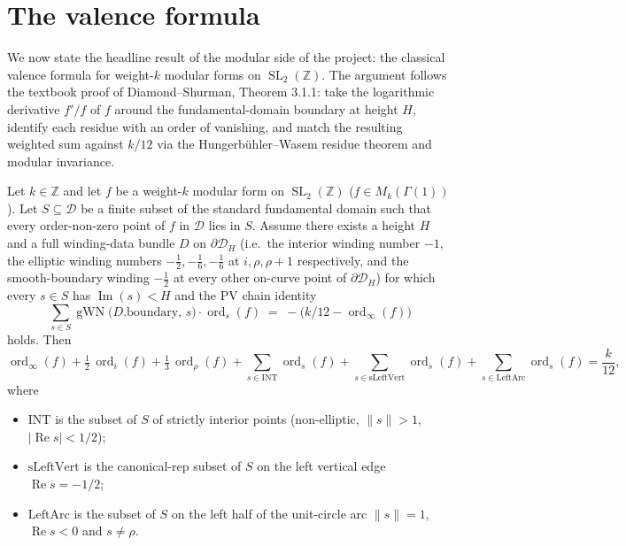 \section{The valence formula}\label{sec:valence}

We now state the headline result of the modular side of the project:
the classical valence formula for weight-$k$ modular forms on
$\operatorname{SL}_2(\mathbb{Z})$. The argument follows the textbook
proof of Diamond--Shurman, Theorem 3.1.1: take the logarithmic
derivative $f'/f$ of $f$ around the fundamental-domain boundary at
height $H$, identify each residue with an order of vanishing, and
match the resulting weighted sum against $k/12$ via the
Hungerbühler--Wasem residue theorem and modular invariance.

\begin{theorem}
  \label{thm:valence-orbit-sum-of-pvChain}
  \leanok
  Let $k \in \mathbb{Z}$ and let $f$ be a weight-$k$ modular form on
  $\operatorname{SL}_2(\mathbb{Z})$ ($f \in M_k(\Gamma(1))$). Let
  $S \subseteq \mathcal{D}$ be a finite subset of the standard
  fundamental domain such that every order-non-zero point of $f$ in
  $\mathcal{D}$ lies in $S$. Assume there exists a height $H$ and a
  full winding-data bundle $D$ on $\partial \mathcal{D}_H$ (i.e.\ the
  interior winding number $-1$, the elliptic winding numbers
  $-\tfrac{1}{2}, -\tfrac{1}{6}, -\tfrac{1}{6}$ at $i, \rho, \rho+1$
  respectively, and the smooth-boundary winding $-\tfrac{1}{2}$ at
  every other on-curve point of $\partial \mathcal{D}_H$) for which
  every $s \in S$ has $\operatorname{Im}(s) < H$ and the
  PV chain identity
  \[
    \sum_{s \in S}
      \operatorname{gWN}\!\bigl(D.\mathrm{boundary},\, s\bigr) \cdot
      \operatorname{ord}_{s}(f)
    \;=\; -\bigl(k/12 - \operatorname{ord}_\infty(f)\bigr)
  \]
  holds. Then
  \[
    \operatorname{ord}_\infty(f) + \tfrac{1}{2}\,\operatorname{ord}_{i}(f)
      + \tfrac{1}{3}\,\operatorname{ord}_{\rho}(f)
      + \sum_{s \in \mathrm{INT}}\operatorname{ord}_{s}(f)
      + \sum_{s \in \mathrm{sLeftVert}} \operatorname{ord}_{s}(f)
      + \sum_{s \in \mathrm{LeftArc}} \operatorname{ord}_{s}(f)
    = \frac{k}{12},
  \]
  where
  \begin{itemize}
    \item $\mathrm{INT}$ is the subset of $S$ of strictly interior
      points (non-elliptic, $\|s\| > 1$, $|\operatorname{Re} s| < 1/2$);
    \item $\mathrm{sLeftVert}$ is the canonical-rep subset of $S$
      on the left vertical edge $\operatorname{Re} s = -1/2$;
    \item $\mathrm{LeftArc}$ is the subset of $S$ on the left half of
      the unit-circle arc $\|s\| = 1$, $\operatorname{Re} s < 0$ and
      $s \ne \rho$.
  \end{itemize}
\end{theorem}

